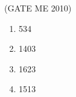 \documentclass[journal,12pt,onecolumn]{IEEEtran}
\theoremstyle{remark}
\begin{document}
\begin{enumerate}
\hfill{(GATE  ME 2010)}\\

\begin{multicols}{4}
\begin{enumerate}
    \item 534
    \item 1403
    \item 1623
    \item  1513
\end{enumerate}
\end{multicols}
\end{enumerate}
\end{document}
